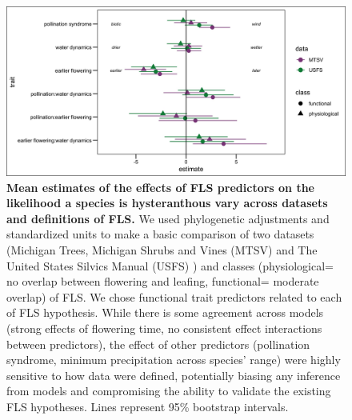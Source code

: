 \documentclass[11pt]{article}
\begin{document}
\begin{figure}[H]
    \centering
 \includegraphics[width=\textwidth]{..//..//MTSV_USFS/MTSV_USFS.jpeg} 
    \caption{\textbf{Mean estimates of the effects of FLS predictors on the likelihood a species is hysteranthous vary across datasets and definitions of FLS.}  We used phylogenetic adjustments and standardized units to make a basic comparison of two datasets (Michigan Trees, Michigan Shrubs and Vines (MTSV) \citep{Barnes2004,Barnes2016} and The United States Silvics Manual (USFS) \citep{Burns1990}) and classes (physiological= no overlap between flowering and leafing, functional= moderate overlap) of FLS. We chose functional trait predictors related to each of FLS hypothesis. While there is some agreement across models (strong effects of flowering time, no consistent effect interactions between predictors), the effect of other predictors (pollination syndrome, minimum precipitation across species' range) were highly sensitive to how data were defined, potentially biasing any inference from models and compromising the ability to validate the existing FLS hypotheses. Lines represent 95\% bootstrap intervals.}
    \label{fig:muplots.USMT}
\end{figure}
\end{document}

